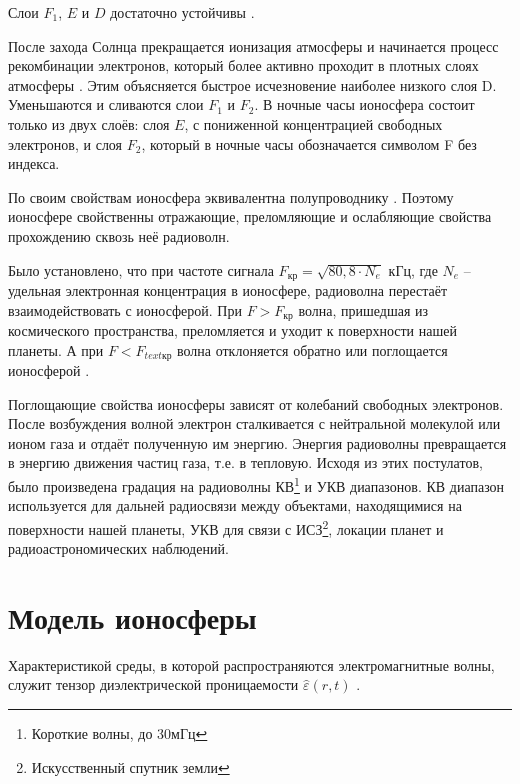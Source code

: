 Слои $F_1$, $E$ и $D$ достаточно устойчивы \cite{Kravcov}.

После захода Солнца прекращается ионизация атмосферы и начинается процесс рекомбинации электронов, который более
активно проходит в плотных слоях атмосферы \cite{Kravcov}. Этим объясняется быстрое исчезновение наиболее 
низкого слоя D. Уменьшаются и сливаются слои $F_1$ и $F_2$. В ночные часы ионосфера состоит только из двух слоёв: 
слоя $E$, с пониженной концентрацией свободных электронов, и слоя $F_2$, который в ночные часы обозначается 
символом F без индекса.

По своим свойствам ионосфера эквивалентна полупроводнику \cite{Kravcov, NeQuick}. Поэтому ионосфере свойственны отражающие, преломляющие и ослабляющие свойства прохождению сквозь неё радиоволн.

Было установлено, что при частоте сигнала $F_{\text{кр}} = \sqrt{80,8 \cdot N_e}$ кГц, 
где $N_e$ -- удельная электронная концентрация в ионосфере, радиоволна перестаёт взаимодействовать с ионосферой. 
При $F > F_{\text{кр}}$ волна, пришедшая из космического пространства, преломляется и уходит к поверхности нашей планеты. 
А при $F < F_{text{кр}}$ волна отклоняется обратно или поглощается ионосферой \cite{Kravcov}.

Поглощающие свойства ионосферы зависят от колебаний свободных электронов. После возбуждения волной электрон
сталкивается с нейтральной молекулой или ионом газа и отдаёт полученную им энергию. Энергия радиоволны превращается
в энергию движения частиц газа, т.е. в тепловую. Исходя из этих постулатов, было произведена градация на радиоволны
КВ\footnote{Короткие волны, до 30мГц} и УКВ диапазонов. КВ диапазон используется для дальней радиосвязи между
объектами, находящимися на поверхности нашей планеты, УКВ для связи с ИСЗ\footnote{Искусственный спутник земли},
локации планет и радиоастрономических наблюдений.

\section{Модель ионосферы}

Характеристикой среды, в которой распространяются электромагнитные волны, служит тензор диэлектрической проницаемости $\hat{\varepsilon}(r, t)$ \cite{Kravcov}.

